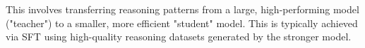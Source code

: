 This involves transferring reasoning patterns from a large, high-performing model ("teacher") to a smaller, more efficient "student" model. This is typically achieved via SFT using high-quality reasoning datasets generated by the stronger model.



